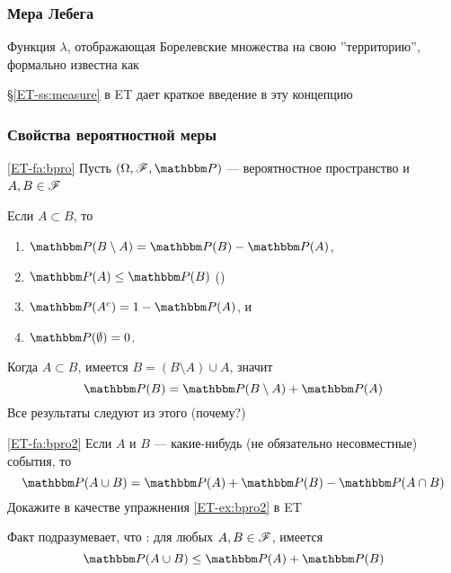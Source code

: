 \begin{frame}\frametitle{Мера Лебега}

        \vspace{2em}
    Функция $\lambda$, отображающая Борелевские множества на
    свою ''территорию'', формально известна как 
    
    \S\ref{ET-ss:measure} в ET дает краткое введение в эту концепцию
    
\end{frame}

\begin{frame}\frametitle{Свойства вероятностной меры}
    
    \vspace{2em}
    \Fact\eqref{ET-fa:bpro}
    Пусть $(\Omega, \fF, \PP)$ --- вероятностное пространство и $A, B \in \mathscr F$\
    
    Если $A \subset B$, то
    \begin{enumerate}
        \item $\PP(B \setminus A) = \PP(B) - \PP(A)$,
        \item $\PP(A) \leq \PP(B)$ ()
        \item $\PP(A^c) = 1 - \PP(A)$, и
        \item $\PP(\emptyset) = 0$.
    \end{enumerate}
     
    \Prf
    Когда $A \subset B$, имеется $B = (B \setminus A) \cup A$, значит
    \begin{equation*}
        \PP(B) = \PP(B \setminus A) + \PP(A)
    \end{equation*}
    Все результаты следуют из этого (почему?)
    
\end{frame}
    
\begin{frame}

    \vspace{2em}
    \Fact\eqref{ET-fa:bpro2}
	Если $A$ и $B$ --- какие-нибудь (не обязательно несовместные) события, то
    \begin{equation*}
        \PP(A \cup B) = \PP(A) + \PP(B) - \PP(A \cap B)       
    \end{equation*}
    Докажите в качестве упражнения \ref{ET-ex:bpro2} в ET

    Факт подразумевает, что : для любых $A, B \in \mathscr F$, имеется
    \begin{equation*}
        \PP(A \cup B) \leq \PP(A) + \PP(B)
    \end{equation*}
    
\end{frame}

